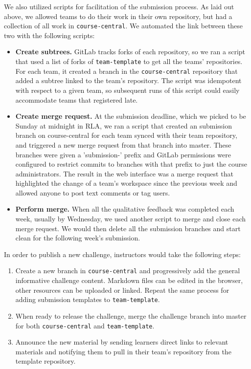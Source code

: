 \documentclass[12pt,twoside]{mitthesis}
\begin{document}
{We also utilized scripts for facilitation of the submission process. As laid out above, we allowed teams to do their work in their own repository, but had a collection of all work in \texttt{course-central}. We automated the link between these two with the following scripts:
\begin{itemize}
\item \textbf{Create subtrees.} GitLab tracks forks of each repository, so we ran a script that used a list of forks of \texttt{team-template} to get all the teams' repositories. For each team, it created a branch in the \texttt{course-central} repository that added a subtree linked to the team's repository. The script was idempotent with respect to a given team, so subsequent runs of this script could easily accommodate teams that registered late.
\item \textbf{Create merge request.} At the submission deadline, which we picked to be Sunday at midnight in RLA, we ran a script that created an submission branch on course-central for each team synced with their team repository, and triggered a new merge request from that branch into master. These branches were given a 'submission-' prefix and GitLab permissions were configured to restrict commits to branches with that prefix to just the course administrators. The result in the web interface was a merge request that highlighted the change of a team's workspace since the previous week and allowed anyone to post text comments or tag users.
\item \textbf{Perform merge.} When all the qualitative feedback was completed each week, usually by Wednesday, we used another script to merge and close each merge request. We would then delete all the submission branches and start clean for the following week's submission.
\end{itemize}

In order to publish a new challenge, instructors would take the following steps:
\begin{enumerate}
\item Create a new branch in \texttt{course-central} and progressively add the general informative challenge content. Markdown files can be edited in the browser, other resources can be uploaded or linked. Repeat the same process for adding submission templates to \texttt{team-template}.
\item When ready to release the challenge, merge the challenge branch into master for both \texttt{course-central} and \texttt{team-template}. 
\item Announce the new material by sending learners direct links to relevant materials and notifying them to pull in their team's repository from the template repository.
\end{enumerate}
}
\end{document}
